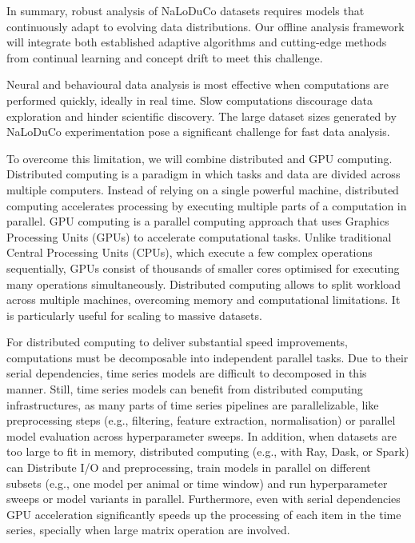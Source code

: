In summary, robust analysis of NaLoDuCo datasets requires models that
continuously adapt to evolving data distributions. Our offline analysis
framework will integrate both established adaptive algorithms and cutting-edge
methods from continual learning and concept drift to meet this challenge.


Neural and behavioural data analysis is most effective when computations are
performed quickly, ideally in real time. Slow computations discourage data
exploration and hinder scientific discovery. The large dataset sizes generated by
NaLoDuCo experimentation pose a significant challenge for fast data analysis.

To overcome this limitation, we will combine distributed and GPU computing.
%
Distributed computing is a paradigm
in which tasks and data are divided across multiple computers. Instead of
relying on a single powerful machine, distributed computing accelerates
processing by executing multiple parts of a computation in parallel.
%
GPU computing is a parallel computing approach that uses Graphics Processing
Units (GPUs) to accelerate computational tasks. Unlike traditional Central
Processing Units (CPUs), which execute a few complex operations sequentially,
GPUs consist of thousands of smaller cores optimised for executing many
operations simultaneously.
%
%
Distributed computing allows to split workload across multiple machines,
overcoming memory and computational limitations. It is particularly useful for
scaling to massive datasets.

For distributed computing to deliver substantial speed improvements,
computations must be decomposable into independent parallel tasks. Due to their
serial dependencies, time series models are difficult to decomposed in this
manner.
%
Still, time series models can benefit from distributed computing
infrastructures, as many parts of time series pipelines are parallelizable,
like preprocessing steps (e.g., filtering, feature extraction, normalisation)
or parallel model evaluation across hyperparameter sweeps.
%
In addition,  when datasets are too large to fit in memory, distributed
computing (e.g., with Ray, Dask, or Spark) can Distribute I/O and
preprocessing, train models in parallel on different subsets (e.g., one model
per animal or time window) and run hyperparameter sweeps or model variants in
parallel.
%
Furthermore, even with serial dependencies GPU acceleration significantly
speeds up the processing of each item in the time series, specially when large
matrix operation are involved.

